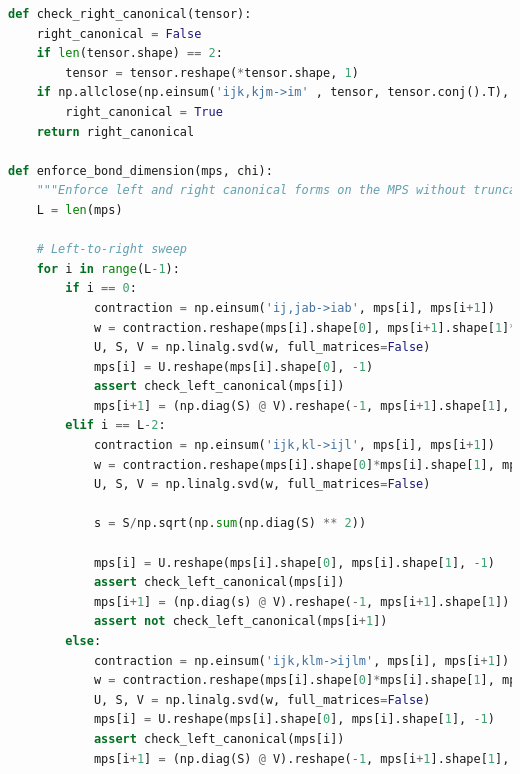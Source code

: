 \documentclass[12pt]{article}
\begin{document}
\begin{lstlisting}[language=Python]
def check_right_canonical(tensor):
    right_canonical = False
    if len(tensor.shape) == 2:
        tensor = tensor.reshape(*tensor.shape, 1)
    if np.allclose(np.einsum('ijk,kjm->im' , tensor, tensor.conj().T), np.eye(tensor.shape[0])):
        right_canonical = True
    return right_canonical
            
def enforce_bond_dimension(mps, chi):
    """Enforce left and right canonical forms on the MPS without truncating."""
    L = len(mps)
    
    # Left-to-right sweep
    for i in range(L-1):
        if i == 0:
            contraction = np.einsum('ij,jab->iab', mps[i], mps[i+1])
            w = contraction.reshape(mps[i].shape[0], mps[i+1].shape[1]*mps[i+1].shape[2])
            U, S, V = np.linalg.svd(w, full_matrices=False)
            mps[i] = U.reshape(mps[i].shape[0], -1)
            assert check_left_canonical(mps[i])
            mps[i+1] = (np.diag(S) @ V).reshape(-1, mps[i+1].shape[1], mps[i+1].shape[2])
        elif i == L-2:
            contraction = np.einsum('ijk,kl->ijl', mps[i], mps[i+1])
            w = contraction.reshape(mps[i].shape[0]*mps[i].shape[1], mps[i+1].shape[1])
            U, S, V = np.linalg.svd(w, full_matrices=False)

            s = S/np.sqrt(np.sum(np.diag(S) ** 2))
            
            mps[i] = U.reshape(mps[i].shape[0], mps[i].shape[1], -1)
            assert check_left_canonical(mps[i])
            mps[i+1] = (np.diag(s) @ V).reshape(-1, mps[i+1].shape[1])
            assert not check_left_canonical(mps[i+1])
        else:
            contraction = np.einsum('ijk,klm->ijlm', mps[i], mps[i+1])
            w = contraction.reshape(mps[i].shape[0]*mps[i].shape[1], mps[i+1].shape[1]*mps[i+1].shape[2])
            U, S, V = np.linalg.svd(w, full_matrices=False)
            mps[i] = U.reshape(mps[i].shape[0], mps[i].shape[1], -1)
            assert check_left_canonical(mps[i])
            mps[i+1] = (np.diag(S) @ V).reshape(-1, mps[i+1].shape[1], mps[i+1].shape[2])


\end{lstlisting}
\end{document}
